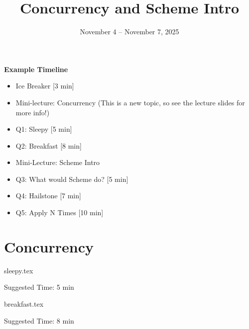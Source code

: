 \documentclass{exam}
\title{Concurrency and Scheme Intro}
\date{November 4 -- November 7, 2025}
\begin{document}
\maketitle

\begin{meta}
    \textbf{Example Timeline}
    \begin{itemize}
        \item Ice Breaker [3 min]
        \item Mini-lecture: Concurrency (This is a new topic, so see the lecture slides for more info!)
        \item Q1: Sleepy [5 min]
        \item Q2: Breakfast [8 min]
        \item Mini-Lecture: Scheme Intro
        \item Q3: What would Scheme do? [5 min]
        \item Q4: Hailstone [7 min]
        \item Q5: Apply N Times [10 min]
    \end{itemize}

\end{meta}

\section{Concurrency}
\begin{questions}
    {sleepy.tex}
    \begin{questionmeta}
        Suggested Time: 5 min
    \end{questionmeta}

    {breakfast.tex}
    \begin{questionmeta}
        Suggested Time: 8 min
    \end{questionmeta}

\end{questions}
\end{document}
